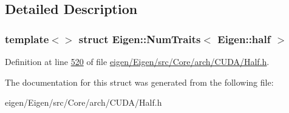 \subsection{Detailed Description}
\subsubsection*{template$<$$>$\newline
struct Eigen\+::\+Num\+Traits$<$ Eigen\+::half $>$}



Definition at line \hyperlink{eigen_2_eigen_2src_2_core_2arch_2_c_u_d_a_2_half_8h_source_l00520}{520} of file \hyperlink{eigen_2_eigen_2src_2_core_2arch_2_c_u_d_a_2_half_8h_source}{eigen/\+Eigen/src/\+Core/arch/\+C\+U\+D\+A/\+Half.\+h}.



The documentation for this struct was generated from the following file\+:\begin{DoxyCompactItemize}
\item 
eigen/\+Eigen/src/\+Core/arch/\+C\+U\+D\+A/\+Half.\+h\end{DoxyCompactItemize}
